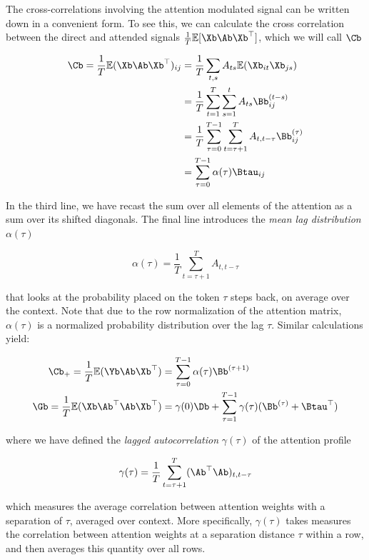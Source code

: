 \documentclass{article}
\begin{document}
The cross-correlations involving the attention modulated signal can be written down in a convenient form. To see this, we can calculate the cross correlation between the direct and attended signals $\frac{1}{T}\mathbb{E}[\Xb \Ab \Xb^\top]$, which we will call $\Cb$

\begin{align}
    \Cb = \frac{1}{T}\mathbb{E}(\Xb \Ab\Xb^\top)_{ij} &= \frac{1}{T}\sum_{t,s} A_{ts}\mathbb{E}(\Xb_{it}\Xb_{js}) \\
    &= \frac{1}{T}\sum_{t=1}^T\sum_{s=1}^t A_{ts} \Bb^{(t-s)}_{ij}\\
    &= \frac{1}{T}\sum_{\tau=0}^{T-1}\sum_{t = \tau+1}^T A_{t, t-\tau} \Bb^{(\tau)}_{ij} \\
 &= \sum_{\tau=0}^{T-1} \alpha(\tau) \Btau_{ij} \label{XAX}
\end{align}

In the third line, we have recast the sum over all elements of the attention as a sum over its shifted diagonals. The final line introduces the \textit{mean lag distribution} $\alpha(\tau)$

\begin{equation}\label{meanlag}
\alpha(\tau) = \frac{1}{T}\sum_{t = \tau+1}^T A_{t,t-\tau}
\end{equation}

that looks at the probability placed on the token $\tau$ steps back, on average over the context. Note that due to the row normalization of the attention matrix, $\alpha(\tau)$ is a normalized probability distribution over the lag $\tau$. Similar calculations yield:



\begin{align}
    \Cb_{+} = \frac{1}{T}\mathbb{E}(\Yb \Ab \Xb^\top) &= \sum_{\tau=0}^{T-1} \alpha(\tau) \Bb^{(\tau+1)} \label{YAX}\\
    \Gb = \frac{1}{T}\mathbb{E}(\Xb \Ab^\top \Ab \Xb^\top) &= \gamma(0) \Db + \sum_{\tau=1}^{T-1} \gamma(\tau) (\Bb^{(\tau)} + {\Btau}^\top) \label{XAAX}
\end{align}

where we have defined the \textit{lagged autocorrelation} $\gamma(\tau)$ of the attention profile 

\begin{equation}\label{meanauto}
\gamma(\tau) = \frac{1}{T}\sum_{t=\tau+1}^T(\Ab^\top\Ab)_{t, t-\tau}
\end{equation}

which measures the average correlation between attention weights with a separation of $\tau$, averaged over context. More specifically, $\gamma(\tau)$ takes measures the correlation between attention weights at a separation distance $\tau$ within a row, and then averages this quantity over all rows. 
\end{document}
